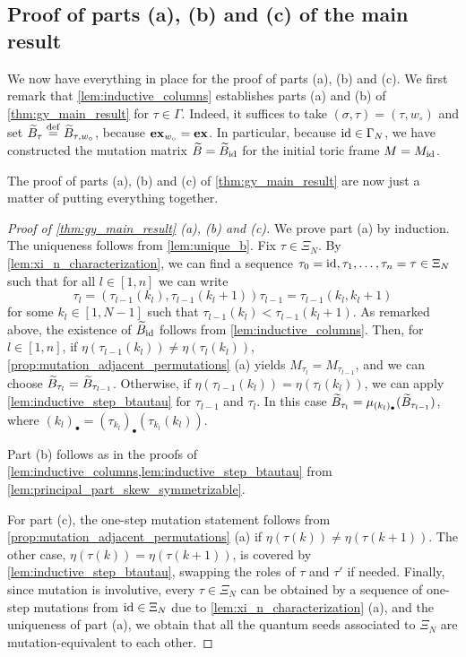 \subsection{Proof of parts (a), (b) and (c) of the main result}

We now have everything in place for the proof of parts (a), (b) and (c). We first
remark that \cref{lem:inductive_columns} establishes parts (a) and (b) of
\cref{thm:gy_main_result} for $\tau \in \Gamma$. Indeed, it suffices to take $(\sigma,
	\tau) = (\tau, w_\circ)$ and set $\widetilde{B}_\tau \overset{\mathrm{def}}{=} \widetilde{B}_{\tau, w_\circ}$, because
$\mathbf{ex}_{w_\circ} = \mathbf{ex}$. In particular, because $\operatorname{id} \in \Gamma_N$, we have constructed
the mutation matrix $\widetilde{B} = \widetilde{B}_{\operatorname{id}}$ for the initial toric frame $M = M_{\operatorname{id}}$.

The proof of parts (a), (b) and (c) of \cref{thm:gy_main_result} are now just a matter
of putting everything together.
\begin{proof}[Proof of \cref{thm:gy_main_result} (a), (b) and (c)]
	We prove part (a) by induction. The uniqueness follows from \cref{lem:unique_b}. Fix $\tau \in \Xi_N$. By \cref{lem:xi_n_characterization}, we can find a sequence $\tau_0 = \operatorname{id}, \tau_1, \dots, \tau_n = \tau \in \Xi_N$ such that for all $l \in [1, n]$ we can write
	\begin{equation*}
		\tau_l = (\tau_{l-1}(k_l), \tau_{l-1}(k_l + 1))\tau_{l-1} = \tau_{l-1}(k_l, k_l + 1)
	\end{equation*}
	for some $k_l \in [1, N-1]$ such that $\tau_{l-1}(k_l) < \tau_{l-1}(k_l + 1)$. As
	remarked above, the existence of $\widetilde{B}_{\operatorname{id}}$ follows from \cref{lem:inductive_columns}.
	Then, for $l \in [1, n]$, if $\eta(\tau_{l-1}(k_l)) \neq \eta(\tau_l(k_l))$,
	\cref{prop:mutation_adjacent_permutations} (a) yields $M_{\tau_l} = M_{\tau_{l-1}}$,
	and we can choose $\widetilde{B}_{\tau_l} = \widetilde{B}_{\tau_{l-1}}$. Otherwise, if
	$\eta(\tau_{l-1}(k_l)) = \eta(\tau_l(k_l))$, we can apply
	\cref{lem:inductive_step_btautau} for $\tau_{l-1}$ and $\tau_{l}$. In this case
	$\widetilde{B}_{\tau_l} = \mu_{(k_l)_\bullet}(\widetilde{B}_{\tau_{l-1}})$, where $(k_l)_\bullet =
		(\tau_{k_l})_\bullet(\tau_{k_l}(k_l))$.

	Part (b) follows as in the proofs of
	\cref{lem:inductive_columns,lem:inductive_step_btautau} from
	\cref{lem:principal_part_skew_symmetrizable}.

	For part (c), the one-step mutation statement follows from
	\cref{prop:mutation_adjacent_permutations} (a) if $\eta(\tau(k)) \neq \eta(\tau(k +
			1))$. The other case, $\eta(\tau(k)) = \eta(\tau(k+1))$, is covered by
	\cref{lem:inductive_step_btautau}, swapping the roles of $\tau$ and $\tau'$ if needed.
	Finally, since mutation is involutive, every $\tau \in \Xi_N$ can be obtained by a
	sequence of one-step mutations from $\operatorname{id}\in \Xi_N$ due to
	\cref{lem:xi_n_characterization} (a), and the uniqueness of part (a), we obtain that
	all the quantum seeds associated to $\Xi_N$ are mutation-equivalent to each other.
\end{proof}

